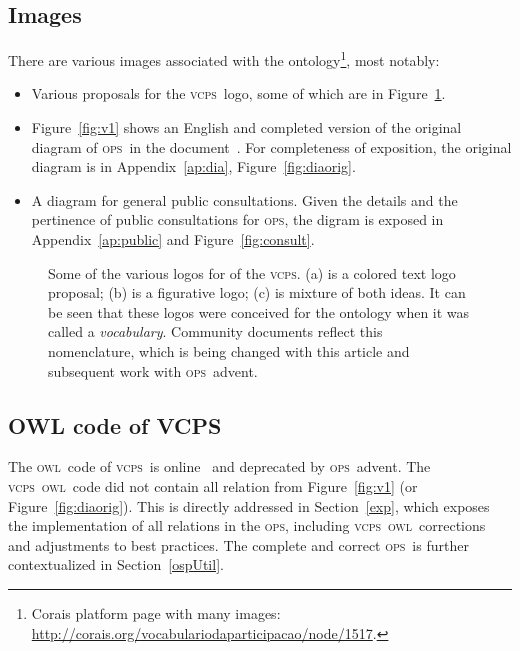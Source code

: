 \documentclass[10pt,letterpaper]{article}
\newcommand{\ops}{\textsc{ops}}
\newcommand{\vcps}{\textsc{vcps}}
\newcommand{\owl}{\textsc{owl}}
\begin{document}
\subsection{Images}\label{sec:im}
There are various images associated with the ontology\footnote{Corais platform page with many images: \url{http://corais.org/vocabulariodaparticipacao/node/1517}.}, most notably:

\begin{itemize}
    \item Various proposals for the \vcps\ logo, some of which are in Figure~\ref{logo}.
    \item Figure~\ref{fig:v1} shows an English and completed version of the original diagram of \ops\ in the document~\cite{conceptualMod}. For completeness of exposition, the original diagram is in Appendix~\ref{ap:dia}, Figure~\ref{fig:diaorig}.
    \item A diagram for general public consultations. Given the details and the pertinence of public consultations for \ops, the digram is exposed in Appendix~\ref{ap:public} and Figure~\ref{fig:consult}.
\end{itemize}

\begin{figure}[!h]
    \centering
    \caption{Some of the various logos for of the \vcps. (a) is a colored text logo proposal; (b) is a figurative logo; (c) is mixture of both ideas. It can be seen that these logos were conceived for the ontology when it was called a \emph{vocabulary}. Community documents reflect this nomenclature, which is being changed with this article and subsequent work with \ops\ advent.}
    \label{logo}
\end{figure}

\subsection{OWL code of VCPS}\label{owl}

The \owl\ code of \vcps\ is online~\cite{owlVcps} and deprecated by \ops\ advent. 
The \vcps\ \owl\ code did not contain all relation from Figure~\ref{fig:v1} (or Figure~\ref{fig:diaorig}). This is directly addressed in Section~\ref{exp}, which exposes the implementation of all relations in the \ops, including \vcps\ \owl\ corrections and adjustments to best practices. The complete and correct \ops\ is further contextualized in Section~\ref{ospUtil}.
\end{document}

